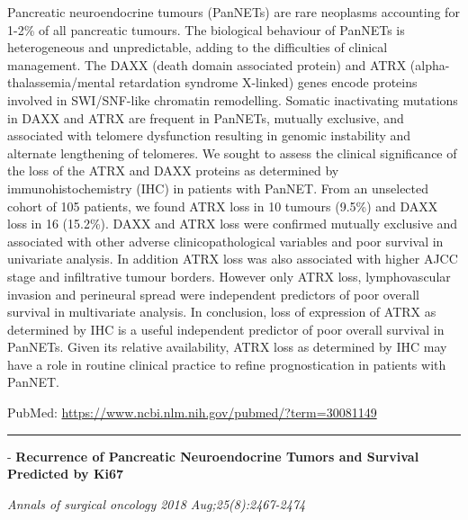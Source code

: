 \documentclass[]{article}
\begin{document}
Pancreatic neuroendocrine tumours (PanNETs) are rare neoplasms
accounting for 1-2\% of all pancreatic tumours. The biological behaviour
of PanNETs is heterogeneous and unpredictable, adding to the
difficulties of clinical management. The DAXX (death domain associated
protein) and ATRX (alpha-thalassemia/mental retardation syndrome
X-linked) genes encode proteins involved in SWI/SNF-like chromatin
remodelling. Somatic inactivating mutations in DAXX and ATRX are
frequent in PanNETs, mutually exclusive, and associated with telomere
dysfunction resulting in genomic instability and alternate lengthening
of telomeres. We sought to assess the clinical significance of the loss
of the ATRX and DAXX proteins as determined by immunohistochemistry
(IHC) in patients with PanNET. From an unselected cohort of 105
patients, we found ATRX loss in 10 tumours (9.5\%) and DAXX loss in 16
(15.2\%). DAXX and ATRX loss were confirmed mutually exclusive and
associated with other adverse clinicopathological variables and poor
survival in univariate analysis. In addition ATRX loss was also
associated with higher AJCC stage and infiltrative tumour borders.
However only ATRX loss, lymphovascular invasion and perineural spread
were independent predictors of poor overall survival in multivariate
analysis. In conclusion, loss of expression of ATRX as determined by IHC
is a useful independent predictor of poor overall survival in PanNETs.
Given its relative availability, ATRX loss as determined by IHC may have
a role in routine clinical practice to refine prognostication in
patients with PanNET.

PubMed: \url{https://www.ncbi.nlm.nih.gov/pubmed/?term=30081149}

{}

{}

\begin{center}\rule{0.5\linewidth}{\linethickness}\end{center}

 - \textbf{Recurrence of Pancreatic Neuroendocrine Tumors and Survival
Predicted by Ki67}

\emph{Annals of surgical oncology 2018 Aug;25(8):2467-2474}
\end{document}
